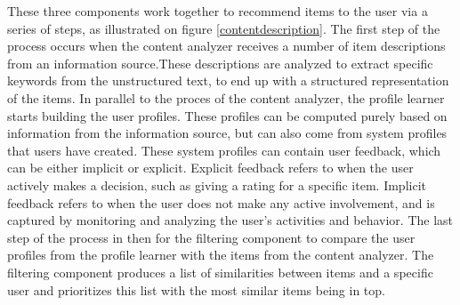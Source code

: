 These three components work together to recommend items to the user via a series of steps, as illustrated on figure \ref{contentdescription}.\newline 
The first step of the process occurs when the content analyzer receives a number of item descriptions from an information source.These descriptions are analyzed to extract specific keywords from the unstructured text, to end up with a structured representation of the items.\newline
In parallel to the proces of the content analyzer, the profile learner starts building the user profiles. These profiles can be computed purely based on information from the information source, but can also come from system profiles that users have created. These system profiles can contain user feedback, which can be either implicit or explicit. Explicit feedback refers to when the user actively makes a decision, such as giving a rating for a specific item. Implicit feedback refers to when the user does not make any active involvement, and is captured by monitoring and analyzing the user's activities and behavior.\newline
The last step of the process in then for the filtering component to compare the user profiles from the profile learner with the items from the content analyzer. The filtering component produces a list of similarities between items and a specific user and prioritizes this list with the most similar items being in top.  

